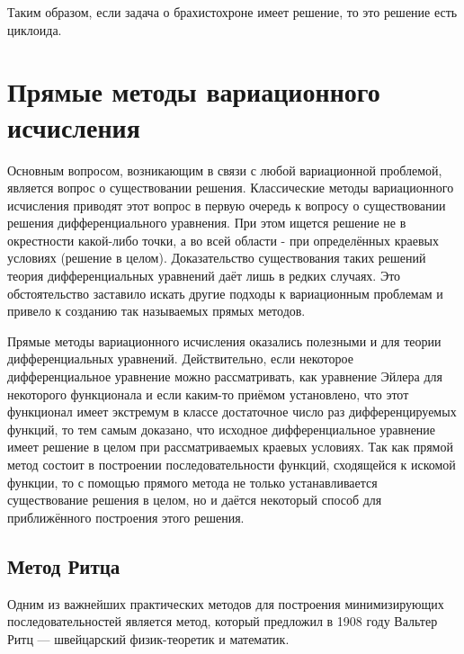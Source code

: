\documentclass{article}
\begin{document}
\noindent Таким образом, если задача о брахистохроне имеет решение, то это решение есть циклоида.


\newpage

\section{Прямые методы вариационного исчисления}

Основным вопросом, возникающим в связи с любой вариационной проблемой, является вопрос о существовании решения. Классические методы вариационного исчисления приводят этот вопрос в первую очередь к вопросу о существовании решения дифференциального уравнения. При этом ищется решение не в окрестности какой-либо точки, а во всей области - при определённых краевых условиях (решение в целом). Доказательство существования таких решений теория дифференциальных уравнений даёт лишь в редких случаях. Это обстоятельство заставило искать другие подходы к вариационным проблемам и привело к созданию так называемых прямых методов.

Прямые методы вариационного исчисления оказались полезными и для теории дифференциальных уравнений. Действительно, если некоторое дифференциальное уравнение можно рассматривать, как уравнение Эйлера для некоторого функционала и если каким-то приёмом установлено, что этот функционал имеет экстремум в классе достаточное число раз дифференцируемых функций, то тем самым доказано, что исходное дифференциальное уравнение имеет решение в целом при рассматриваемых краевых условиях. Так как прямой метод состоит в построении последовательности функций, сходящейся к искомой функции, то с помощью прямого метода не только устанавливается существование решения в целом, но и даётся некоторый способ для приближённого построения этого решения.


\subsection{Метод Ритца}

Одним из важнейших практических методов для построения минимизирующих последовательностей является метод, который предложил в 1908 году Вальтер Ритц --- швейцарский физик-теоретик и математик.
\end{document}
